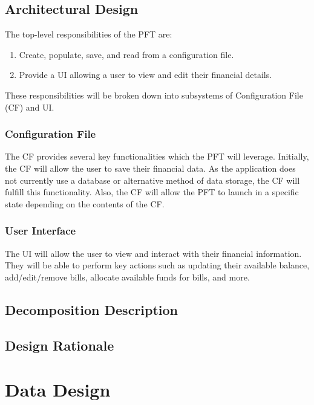 \documentclass{article}
\begin{document}
\subsection{Architectural Design}

The top-level responsibilities of the PFT are:

\begin{enumerate}
    \item Create, populate, save, and read from a configuration file.
    \item Provide a UI allowing a user to view and edit their financial details.
\end{enumerate}

These responsibilities will be broken down into subsystems of Configuration File (CF) and UI.

\subsubsection{Configuration File}

The CF provides several key functionalities which the PFT will leverage. Initially, the CF will allow the user to save their financial data. As the application does not currently use a database or alternative method of data storage,
the CF will fulfill this functionality. Also, the CF will allow the PFT to launch in a specific state depending on the contents of the CF.

\subsubsection{User Interface}

The UI will allow the user to view and interact with their financial information. They will be able to perform key actions such as updating their available balance, add/edit/remove bills, allocate available funds for bills, and more.  

\subsection{Decomposition Description}

\subsection{Design Rationale}

\section{Data Design}
\end{document}
